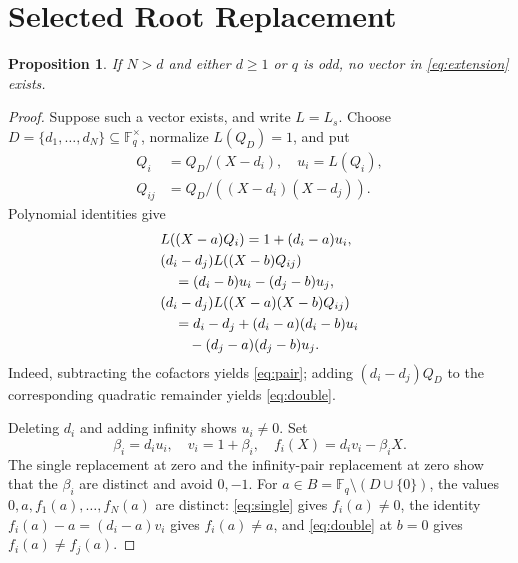 \documentclass[12pt,letterpaper,onecolumn]{article}
\newtheorem{proposition}[theorem]{Proposition}
\theoremstyle{definition}
\newcommand{\F}{\mathbb F}
\begin{document}
\section{Selected Root Replacement}
\begin{proposition}\label{prop:large}
If $N>d$ and either $d\ge1$ or $q$ is odd, no vector in \eqref{eq:extension} exists.
\end{proposition}
\begin{proof}
Suppose such a vector exists, and write $L=L_s$. Choose $D=\{d_1,\ldots,d_N\}\subseteq\F_q^\times$, normalize $L(Q_D)=1$, and put
\[
 \begin{aligned}
 Q_i&=Q_D/(X-d_i),\quad u_i=L(Q_i),\\
 Q_{ij}&=Q_D/((X-d_i)(X-d_j)).
 \end{aligned}
\]
Polynomial identities give
\begin{align}
 &L((X-a)Q_i)=1+(d_i-a)u_i,\label{eq:single}\\
 &(d_i-d_j)L((X-b)Q_{ij})\notag\\
 &\quad=(d_i-b)u_i-(d_j-b)u_j,\label{eq:pair}\\
 &(d_i-d_j)L((X-a)(X-b)Q_{ij})\notag\\
 &\quad=d_i-d_j+(d_i-a)(d_i-b)u_i\notag\\
 &\qquad-(d_j-a)(d_j-b)u_j.\label{eq:double}
\end{align}
Indeed, subtracting the cofactors yields \eqref{eq:pair}; adding $(d_i-d_j)Q_D$ to the corresponding quadratic remainder yields \eqref{eq:double}.

Deleting $d_i$ and adding infinity shows $u_i\ne0$. Set
\[
 \beta_i=d_iu_i,\quad v_i=1+\beta_i,\quad
 f_i(X)=d_iv_i-\beta_iX.
\]
The single replacement at zero and the infinity-pair replacement at zero show that the $\beta_i$ are distinct and avoid $0,-1$. For $a\in B=\F_q\setminus(D\cup\{0\})$, the values $0,a,f_1(a),\ldots,f_N(a)$ are distinct: \eqref{eq:single} gives $f_i(a)\ne0$, the identity $f_i(a)-a=(d_i-a)v_i$ gives $f_i(a)\ne a$, and \eqref{eq:double} at $b=0$ gives $f_i(a)\ne f_j(a)$.


\end{proof}
\end{document}
